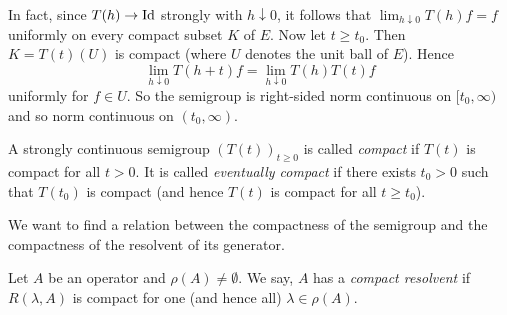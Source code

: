 In fact, since $T(h) \to \operatorname{Id} $ strongly with $h \downarrow 0$, it follows that $\lim_{h \downarrow 0} T(h)f = f$ uniformly on every compact subset $K$ of\/ $E$.
Now let $t \geq t_0$.
Then $K = T(t)(U)$ is compact (where $U$ denotes the unit ball of\/ $E$).
Hence 
%
\[
	\lim \limits_{h \downarrow 0} T(h+t)f = \lim \limits_{h \downarrow 0} T(h)T(t)f 
\]
%
uniformly for $f \in U$.
So the semigroup is right-sided norm continuous on $[t_0,\infty)$ and so norm continuous on $(t_0,\infty)$.

\begin{definition}\label{def:a2-1.22}
A strongly continuous semigroup $(T(t))_{t\geq 0}$ is called \emph{compact} if\/ $T(t)$ is compact for all $t > 0$. It is called \emph{eventually compact} if there exists $t_0 > 0$ such that $T(t_0)$ is compact (and hence $T(t)$ is compact for all $t \geq t_0$).
\end{definition}

We want to find a relation between the compactness of the semigroup and the compactness of the resolvent of its generator.

\begin{definition}\label{def:a2-1.23}

Let $A$ be an operator and $\rho(A) \neq \emptyset$.
We say, $A$ has a \emph{compact resolvent} if\/ $R(\lambda,A)$ is compact for one (and hence all) $\lambda \in \rho(A)$.
\end{definition}

